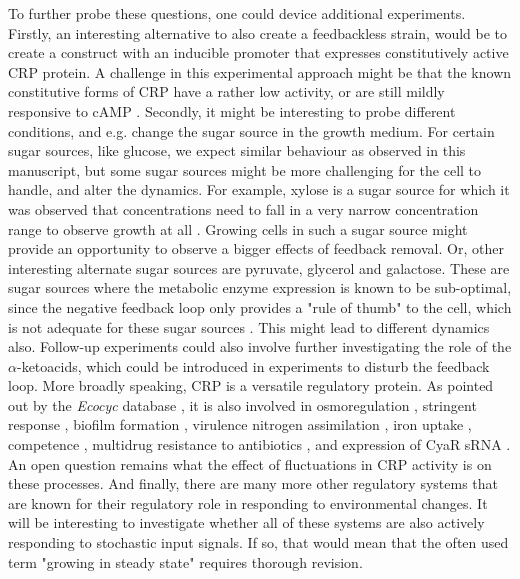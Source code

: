 To further probe these questions, one could device additional experiments.
%
Firstly, an interesting alternative to also create a feedbackless strain, would be to
create a construct with an inducible promoter that expresses 
constitutively active CRP protein. %
A challenge in this experimental approach might be that the known constitutive forms of CRP have a rather low activity, or are still mildly responsive to cAMP \cite{Aiba1985, Garges1985}.
%
Secondly, it might be interesting to probe different conditions, and e.g. change the sugar source in the growth medium.
For certain sugar sources, like glucose, we expect similar behaviour as observed in this manuscript, 
but some sugar sources might be more challenging for the cell to handle, and alter the dynamics.
% 
For example, xylose is a sugar source for which it was observed that concentrations need to fall in a very narrow concentration range to observe growth at all \cite{Towbin2017personalcomm}. 
Growing cells in such a sugar source might provide an opportunity to observe a bigger effects of feedback removal. %
%
Or, other interesting alternate sugar sources are pyruvate, glycerol and galactose. These are sugar sources where the metabolic enzyme expression is known to be sub-optimal, since the negative feedback loop only provides a "rule of thumb" to the cell, which is not adequate for these sugar sources \cite{Towbin2017}. 
%
This might lead to different dynamics also.
%
Follow-up experiments could also involve further investigating the role of the $\alpha$-ketoacids, 
which could be introduced in experiments to disturb the feedback loop.
%
More broadly speaking, 
CRP is a versatile regulatory protein.%
%
As pointed out by the \textit{Ecocyc} database \cite{Keseler2017}, it is also involved in 
osmoregulation \cite{Landis1999},
stringent response \cite{Johansson2000}, 
biofilm formation \cite{Jackson2002}, 
virulence \cite{Baga1985} %
nitrogen assimilation \cite{Mao2007, Paul2007}, 
iron uptake \cite{Zhang2005}, 
competence \cite{Sinha2009}, 
multidrug resistance to antibiotics \cite{Hirakawa2006a}, 
and expression of CyaR sRNA \cite{DeLay2009a}.
%
An open question remains what the effect of fluctuations in CRP activity is on these processes.
%
%
And finally,
there are many more other 
regulatory systems 
that are known for their regulatory role in responding to environmental changes.
It will be interesting to
investigate whether all of these systems are also actively responding to stochastic input signals.
%
If so, 
that would mean that the often used term "growing in steady state" requires thorough revision.


